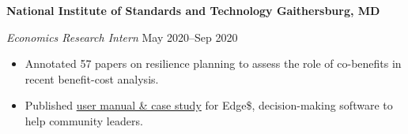 \textbf{National Institute of Standards and Technology \hfill Gaithersburg, MD}\par

\textit{Economics Research Intern} \hfill May 2020--Sep 2020
\begin{itemize}
	\item Annotated 57 papers on resilience planning to assess the role of co-benefits in recent benefit-cost analysis.
	\item Published \href{https://nvlpubs.nist.gov/nistpubs/SpecialPublications/NIST.SP.1260.pdf}{user manual \& case study} for Edge\$, decision-making software to help community leaders.
\end{itemize}\par